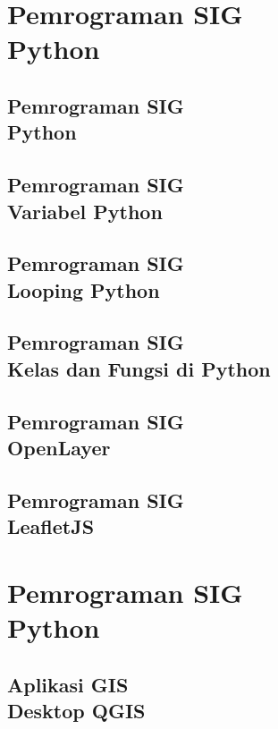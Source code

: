 \documentclass{WileySix}
\begin{document}
\part[Pemrograman SIG]
{Pemrograman SIG\\ Python}

\chapter[Python]
{Pemrograman SIG\\ Python}


\chapter[Variabel]
{Pemrograman SIG\\ Variabel Python}



\chapter[Looping]
{Pemrograman SIG\\ Looping Python}


\chapter[Kelas dan Fungsi di Python]
{Pemrograman SIG\\ Kelas dan Fungsi di Python}


\chapter[OpenLayer]
{Pemrograman SIG\\ OpenLayer}


\chapter[LeafletJS]
{Pemrograman SIG\\ LeafletJS}


\part[Aplikasi SIG]
{Pemrograman SIG\\ Python}

\chapter[QGIS]
{Aplikasi GIS\\ Desktop QGIS}

\end{document}
